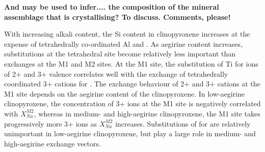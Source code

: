 \documentclass[review,authoryear,12pt]{elsarticle}
\begin{document}
\textbf{And may be used to infer.... the composition of the mineral assemblage that is crystallising? To discuss. Comments, please!}

	With increasing alkali content, the Si content in clinopyroxene increases at the expense of tetrahedrally co-ordinated Al and . As aegirine content increases, substitutions at the tetrahedral site become relatively less important than exchanges at the M1 and M2 sites.
	At the M1 site, the substitution of Ti for ions of 2+ and 3+ valence correlates well with the exchange of tetrahedrally coordinated 3+ cations for . 
	The exchange behaviour of 2+ and 3+ cations at the M1 site depends on the aegirine content of the clinopyroxene. In low-aegirine clinopyroxene, the concentration of 3+ ions at the M1 site is negatively correlated with $X_{Na}^{M2}$, whereas in medium- and high-aegirine clinopyroxene, the M1 site takes progressively more 3+ ions as $X_{Na}^{M2}$ increases. Substitutions of  for  are relatively unimportant in low-aegirine clinopyroxene, but play a large role in medium- and high-aegirine exchange vectors.




\end{document}
